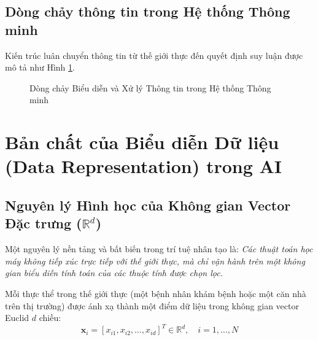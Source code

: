 \documentclass[12pt,a4paper]{report}
\begin{document}
\subsection{Dòng chảy thông tin trong Hệ thống Thông minh}
Kiến trúc luân chuyển thông tin từ thế giới thực đến quyết định suy luận được mô tả như Hình \ref{fig:ml_flow}.

\begin{figure}[H]
\centering
{}
\caption{Dòng chảy Biểu diễn và Xử lý Thông tin trong Hệ thống Thông minh}
\label{fig:ml_flow}
\end{figure}

\section{Bản chất của Biểu diễn Dữ liệu (Data Representation) trong AI}

\subsection{Nguyên lý Hình học của Không gian Vector Đặc trưng ($\mathbb{R}^d$)}
Một nguyên lý nền tảng và bất biến trong trí tuệ nhân tạo là: \textit{Các thuật toán học máy không tiếp xúc trực tiếp với thế giới thực, mà chỉ vận hành trên một không gian biểu diễn tính toán của các thuộc tính được chọn lọc.} 

Mỗi thực thể trong thế giới thực (một bệnh nhân khám bệnh hoặc một căn nhà trên thị trường) được ánh xạ thành một điểm dữ liệu trong không gian vector Euclid $d$ chiều:
\begin{equation}
\mathbf{x}_i = [x_{i1}, x_{i2}, \dots, x_{id}]^T \in \mathbb{R}^d, \quad i = 1, \dots, N
\end{equation}
\end{document}
